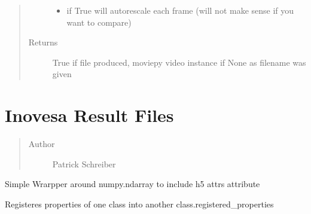 \documentclass[letterpaper,10pt,openany,oneside,english]{sphinxmanual}
\begin{document}
\begin{fulllineitems}
\begin{fulllineitems}
\begin{quote}
\begin{description}
\begin{itemize}
\item {} 
\sphinxstyleliteralstrong{(}\sphinxstyleliteralstrong{)} \textendash{} if True will autorescale each frame (will not make sense if  
you want to compare)

\end{itemize}

\item[{Returns}] \leavevmode
True if file produced, moviepy video instance if None as filename was given

\end{description}\end{quote}

\end{fulllineitems}


\end{fulllineitems}

\label{\detokenize{file:module-file}}

\chapter{Inovesa Result Files}
\label{\detokenize{file:file}}\label{\detokenize{file:inovesa-result-files}}\label{\detokenize{file::doc}}\begin{quote}\begin{description}
\item[{Author}] \leavevmode
Patrick Schreiber

\end{description}\end{quote}

\begin{fulllineitems}
\label{\detokenize{file:file.AttributedNPArray}}
Simple Wrarpper around numpy.ndarray to include h5 attrs attribute

\end{fulllineitems}


\begin{fulllineitems}
\label{\detokenize{file:file.registered}}
Registeres properties of one class into another class.registered\_properties

\end{fulllineitems}
\end{document}
